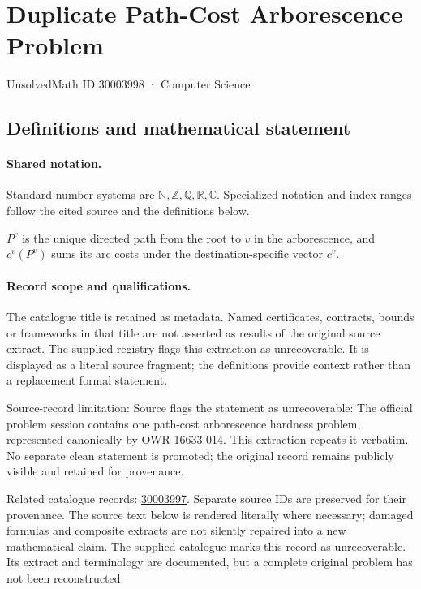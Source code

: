 \documentclass[11pt]{article}
\begin{document}
\setcounter{section}{30003997}
\section{Duplicate Path-Cost Arborescence Problem}\label{30003998}
{\small\sffamily UnsolvedMath ID 30003998 · Computer Science}
\subsection{Definitions and mathematical statement}

\paragraph{Shared notation.}Standard number systems are $\mathbb N,\mathbb Z,\mathbb Q,\mathbb R,\mathbb C$. Specialized notation and index ranges follow the cited source and the definitions below.


$P^v$ is the unique directed path from the root to $v$ in the arborescence, and $c^v(P^v)$ sums its arc costs under the destination-specific vector $c^v$.
\paragraph{Record scope and qualifications.}
The catalogue title is retained as metadata. Named certificates, contracts, bounds or frameworks in that title are not asserted as results of the original source extract.
The supplied registry flags this extraction as unrecoverable. It is displayed as a literal source fragment; the definitions provide context rather than a replacement formal statement.

Source-record limitation: Source flags the statement as unrecoverable: The official problem session contains one path-cost arborescence hardness problem, represented canonically by OWR-16633-014. This extraction repeats it verbatim. No separate clean statement is promoted; the original record remains publicly visible and retained for provenance.

Related catalogue records: \href{https://mehmetmars7.github.io/Erdosproblems-llm-hunter/problem.html?type=open_problems&id=30003997}{30003997}. Separate source IDs are preserved for their provenance.
The source text below is rendered literally where necessary; damaged formulas and composite extracts are not silently repaired into a new mathematical claim.
The supplied catalogue marks this record as unrecoverable. Its extract and terminology are documented, but a complete original problem has not been reconstructed.
\end{document}
